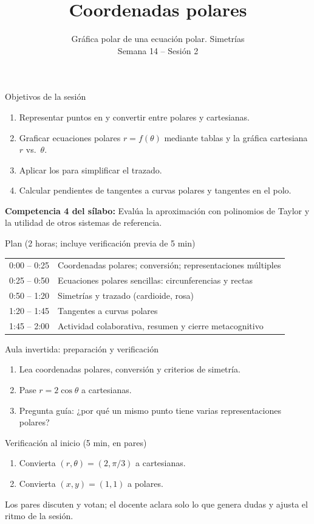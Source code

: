 \documentclass[10pt,aspectratio=169]{beamer}
\title[Coordenadas polares]{Coordenadas polares}
\subtitle{Gráfica polar de una ecuación polar. Simetrías\\[2pt]\small Semana 14 -- Sesión 2}
\begin{document}
\begin{frame}
  \titlepage
\end{frame}

\begin{frame}{Objetivos de la sesión}
  \begin{enumerate}
    \item Representar puntos en  y convertir entre polares y cartesianas.
    \item Graficar ecuaciones polares $r=f(\theta)$ mediante tablas y la gráfica cartesiana $r$ vs.\ $\theta$.
    \item Aplicar los  para simplificar el trazado.
    \item Calcular pendientes de tangentes a curvas polares y tangentes en el polo.
  \end{enumerate}
  \vspace{1mm}
  {\small\textbf{Competencia 4 del sílabo:} Evalúa la aproximación con polinomios de Taylor y la utilidad de otros sistemas de referencia.}
  \begin{block}{Plan (2 horas; incluye verificación previa de 5 min)}
    \begin{tabular}{ll}
      0:00 -- 0:25 & Coordenadas polares; conversión; representaciones múltiples\\
      0:25 -- 0:50 & Ecuaciones polares sencillas: circunferencias y rectas\\
      0:50 -- 1:20 & Simetrías y trazado (cardioide, rosa)\\
      1:20 -- 1:45 & Tangentes a curvas polares\\
      1:45 -- 2:00 & Actividad colaborativa, resumen y cierre metacognitivo
    \end{tabular}
  \end{block}
\end{frame}

\begin{frame}{Aula invertida: preparación y verificación}
  \small
  \begin{previa}
    \begin{enumerate}
      \item Lea coordenadas polares, conversión y criterios de simetría.
      \item Pase $r=2\cos\theta$ a cartesianas.
      \item Pregunta guía: ¿por qué un mismo punto tiene varias representaciones polares?
    \end{enumerate}
  \end{previa}
  \begin{block}{Verificación al inicio (5 min, en pares)}
    \begin{enumerate}
      \item Convierta $(r,\theta)=(2,\pi/3)$ a cartesianas.
      \item Convierta $(x,y)=(1,1)$ a polares.
    \end{enumerate}
    Los pares discuten y votan; el docente aclara solo lo que genera dudas y ajusta el ritmo de la sesión.
  \end{block}
\end{frame}
\end{document}
